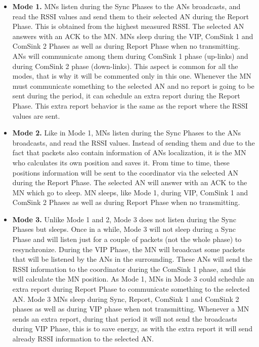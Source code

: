 \begin{itemize}
 \item \textbf{Mode 1.} \acp{MN} listen during the Sync Phases to the \acp{AN} broadcasts, and read the \ac{RSSI} values and send them
to their selected \ac{AN} during the Report Phase. This is obtained from the highest measured \ac{RSSI}. The selected \ac{AN} answers with an \ac{ACK} 
to the \ac{MN}. \acp{MN} sleep during the \ac{VIP}, ComSink 1 and ComSink 2 Phases as well as during Report Phase when no transmitting. 
\acp{AN} will communicate among them during ComSink 1 phase (up-links) and during ComSink 2 phase (down-links). This aspect is common for all the 
modes, that is why it will be commented only in this one. Whenever the \ac{MN} must communicate something to the selected \ac{AN} and no report 
is going to be sent during the period, it can schedule an extra report during the Report Phase. This extra report behavior is the same as the report 
where the \ac{RSSI} values are sent.
 
 \item \textbf{Mode 2.} Like in Mode 1, \acp{MN} listen during the Sync Phases to the \acp{AN} broadcasts, and read the \ac{RSSI} values. Instead
of sending them and due to the fact that packets also contain information of \acp{AN} localization, it is the \ac{MN} who calculates its own position 
and saves it. From time to time, these positions information will be sent to the coordinator via the selected \ac{AN} during the Report Phase. The 
selected \ac{AN} will answer with an \ac{ACK} to the \ac{MN} which go to sleep. \ac{MN} sleeps, like Mode 1, during \ac{VIP}, ComSink 1 and ComSink 2 
Phases as well as during Report Phase when no transmitting.

 \item \textbf{Mode 3.} Unlike Mode 1 and 2, Mode 3 does not listen during the Sync Phases but sleeps. Once in a while, Mode 3 will not sleep during a 
Sync Phase and will listen just for a couple of packets (not the whole phase) to resynchronize. During the \ac{VIP} Phase, the \ac{MN} will broadcast
some packets that will be listened by the \acp{AN} in the surrounding. These \acp{AN} will send the \ac{RSSI} information to the coordinator during the 
ComSink 1 phase, and this will calculate the \ac{MN} position. As Mode 1, \acp{MN} in Mode 3 could schedule an extra report during Report Phase to
communicate something to the selected \ac{AN}. Mode 3 \acp{MN} sleep during Sync, Report, ComSink 1 and ComSink 2 phases as well as during \ac{VIP} phase
when not transmitting. Whenever a \ac{MN} sends an extra report, during that period it will not send the broadcasts during \ac{VIP} Phase, this is to 
save energy, as with the extra report it will send already \ac{RSSI} information to the selected \ac{AN}.


\end{itemize}
